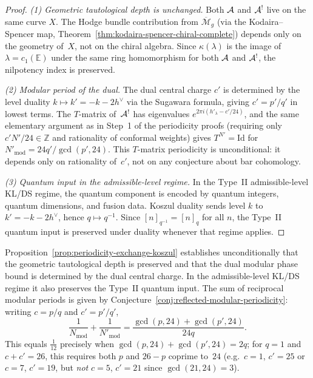 \begin{proof}
\emph{(1) Geometric tautological depth is unchanged.}
Both $\mathcal{A}$ and $\mathcal{A}^!$ live on the same curve $X$.  The Hodge bundle contribution from $\overline{\mathcal{M}}_g$ (via the Kodaira--Spencer map, Theorem~\ref{thm:kodaira-spencer-chiral-complete}) depends only on the geometry of~$X$, not on the chiral algebra.  Since $\kappa(\lambda)$ is the image of $\lambda = c_1(\mathbb{E})$ under the same ring homomorphism for both $\mathcal{A}$ and $\mathcal{A}^!$, the nilpotency index is preserved.

\emph{(2) Modular period of the dual.}
The dual central charge $c'$ is determined by the level duality $k \mapsto k' = -k - 2h^\vee$ via the Sugawara formula, giving $c' = p'/q'$ in lowest terms.  The $T$-matrix of~$\mathcal{A}^!$ has eigenvalues $e^{2\pi i(h'_\lambda - c'/24)}$, and the same elementary argument as in Step~1 of the periodicity proofs (requiring only $c'N'/24 \in \mathbb{Z}$ and rationality of conformal weights) gives $T^{N'} = \mathrm{Id}$ for $N'_{\text{mod}} = 24q'/\gcd(p',24)$.  This $T$-matrix periodicity is unconditional: it depends only on rationality of~$c'$, not on any conjecture about bar cohomology.

\emph{(3) Quantum input in the admissible-level regime.}
In the Type~II admissible-level KL/DS regime, the quantum component is
encoded by quantum integers, quantum dimensions, and fusion data.
Koszul duality sends level $k$ to $k' = -k - 2h^\vee$, hence
$q \mapsto q^{-1}$.  Since $[n]_{q^{-1}} = [n]_q$ for all $n$, the
Type~II quantum input is preserved under duality whenever that regime
applies.
\end{proof}

\begin{remark}\label{rem:periodicity-exchange-harmonic}
Proposition~\ref{prop:periodicity-exchange-koszul} establishes
unconditionally that the geometric tautological depth is preserved and
that the dual modular phase bound is determined by the dual central
charge.  In the admissible-level KL/DS regime it also preserves the
Type~II quantum input.  The sum of reciprocal modular periods is given by
Conjecture~\ref{conj:reflected-modular-periodicity}: writing $c = p/q$
and $c' = p'/q'$,
\[
\frac{1}{N_{\text{mod}}} + \frac{1}{N'_{\text{mod}}}
= \frac{\gcd(p,24) + \gcd(p',24)}{24q}.
\]
This equals $\frac{1}{12}$ precisely when $\gcd(p,24) + \gcd(p',24) = 2q$; for $q = 1$ and $c + c' = 26$, this requires both $p$ and $26 - p$ coprime to~$24$ (e.g.\ $c = 1$, $c' = 25$ or $c = 7$, $c' = 19$, but \emph{not} $c = 5$, $c' = 21$ since $\gcd(21, 24) = 3$).
\end{remark}



